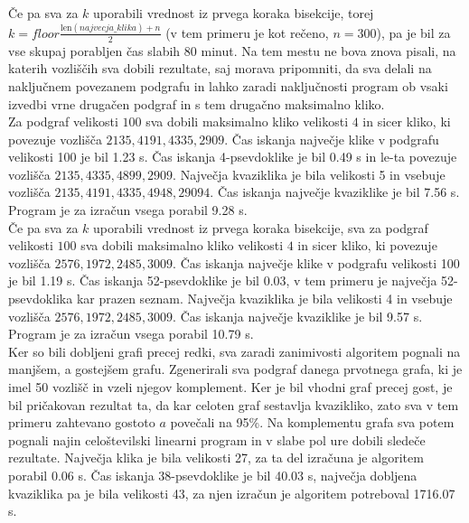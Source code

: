 \documentclass[12pt,a4paper]{amsart}
\theoremstyle{definition}
\theoremstyle{plain}
\begin{document}
Če pa sva za $k$ uporabili vrednost iz prvega koraka bisekcije, torej \\ $k = floor\frac{\mathrm{len}(najvecja\_klika) + n}{2}$ (v tem primeru je kot rečeno, $n = 300$), pa je bil za vse skupaj porabljen čas slabih 80 minut. Na tem mestu ne bova znova pisali, na katerih vozliščih sva dobili rezultate, saj morava pripomniti, da sva delali na naključnem povezanem podgrafu in lahko zaradi naključnosti program ob vsaki izvedbi vrne drugačen podgraf in s tem drugačno maksimalno kliko.\\

Za podgraf velikosti $100$ sva dobili maksimalno kliko velikosti $4$ in sicer kliko, ki povezuje vozlišča $2135, 4191, 4335, 2909$. Čas iskanja največje klike v podgrafu velikosti 100 je bil 1.23 s. Čas iskanja 4-psevdoklike je bil 0.49 s in le-ta povezuje vozlišča $2135, 4335, 4899, 2909$.
Največja kvaziklika je bila velikosti 5 in vsebuje vozlišča $2135, 4191, 4335, 4948, 29094$. Čas iskanja največje kvaziklike je bil 7.56 s. Program je za izračun vsega porabil 9.28 s. 
\\

Če pa sva za $k$ uporabili vrednost iz prvega koraka bisekcije, sva za podgraf velikosti $100$ sva dobili maksimalno kliko velikosti $4$ in sicer kliko, ki povezuje vozlišča $2576, 1972, 2485, 3009$. Čas iskanja največje klike v podgrafu velikosti 100 je bil 1.19 s. Čas iskanja 52-psevdoklike je bil 0.03, v tem primeru je največja 52-psevdoklika kar prazen seznam. Največja kvaziklika je bila velikosti 4 in vsebuje vozlišča $2576, 1972, 2485, 3009$. Čas iskanja največje kvaziklike je bil 9.57 s. Program je za izračun vsega porabil 10.79 s. 
\\

Ker so bili dobljeni grafi precej redki, sva zaradi zanimivosti algoritem pognali na manjšem, a gostejšem grafu. Zgenerirali sva podgraf danega prvotnega grafa, ki je imel 50 vozlišč in vzeli njegov komplement. Ker je bil vhodni graf precej gost, je bil pričakovan rezultat ta, da kar celoten graf sestavlja kvazikliko, zato sva v tem primeru zahtevano gostoto $a$ povečali na 95\%. Na komplementu grafa sva potem pognali najin celoštevilski linearni program in v slabe pol ure dobili sledeče rezultate. Največja klika je bila velikosti 27, za ta del izračuna je algoritem porabil 0.06 s. Čas iskanja 38-psevdoklike je bil 40.03 s, največja dobljena kvaziklika pa je bila velikosti 43, za njen izračun je algoritem potreboval 1716.07 s.
\\
\end{document}
